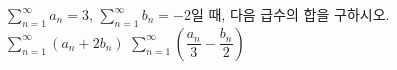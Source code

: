 $\displaystyle\sum_{n=1}^{\infty} a_n=3$, $\displaystyle\sum_{n=1}^{\infty} b_n=-2$일 때, 다음 급수의 합을 구하시오.
 $\displaystyle\sum_{n=1}^{\infty}(a_n+2b_n)$
 $\displaystyle\sum_{n=1}^{\infty}\left(\dfrac{a_n}{3}-\dfrac{b_n}{2}\right)$
